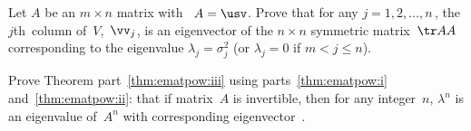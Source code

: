 \begin{exercise} \label{ex:} 
Let \(A\) be an \(m\times n\)  matrix with \svd\ \(A=\usv\).
Prove that for any \(j=1,2,\ldots,n\)\,, the \(j\)th~column of~\(V\),~\(\vv_j\), is an eigenvector of the \(n\times n\) {symmetric matrix}~\(\tr AA\) corresponding to the eigenvalue \(\lambda_j=\sigma_j^2\) (or \(\lambda_j=0\) if \(m<j\leq n\)).
\end{exercise}



\begin{exercise} \label{ex:ematpow:iii} 
Prove Theorem part~\ref{thm:ematpow:iii} using parts~\ref{thm:ematpow:i} and~\ref{thm:ematpow:ii}: that if matrix~\(A\) is {invertible}, then for any integer~\(n\), \(\lambda^n\) is an {eigenvalue} of~\(A^n\) with corresponding {eigenvector}~\xv.
\end{exercise}





